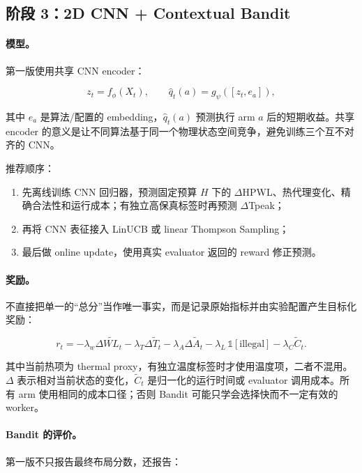 \documentclass[UTF8,a4paper,11pt]{ctexart}
\begin{document}
\subsection{阶段 3：2D CNN + Contextual Bandit}

\paragraph{模型。} 第一版使用共享 CNN encoder：

\begin{equation}
z_t=f_\phi(X_t),\qquad
\hat{q}_t(a)=g_\psi([z_t,e_a]),
\end{equation}

其中 \(e_a\) 是算法/配置的 embedding，\(\hat{q}_t(a)\) 预测执行 arm \(a\) 后的短期收益。共享 encoder 的意义是让不同算法基于同一个物理状态空间竞争，避免训练三个互不对齐的 CNN。

推荐顺序：

\begin{enumerate}
    \item 先离线训练 CNN 回归器，预测固定预算 \(H\) 下的 \(\Delta\)HPWL、热代理变化、精确合法性和运行成本；有独立高保真标签时再预测 \(\Delta\)Tpeak；
    \item 再将 CNN 表征接入 LinUCB 或 linear Thompson Sampling；
    \item 最后做 online update，使用真实 evaluator 返回的 reward 修正预测。
\end{enumerate}

\paragraph{奖励。} 不直接把单一的“总分”当作唯一事实，而是记录原始指标并由实验配置产生目标化奖励：

\begin{equation}
r_t = -\lambda_w\Delta \widetilde{WL}_t
       -\lambda_T\Delta \widetilde{T}_t
       -\lambda_A\Delta \widetilde{A}_t
       -\lambda_L\,\mathbb{1}[\text{illegal}]
       -\lambda_C\widetilde{C}_t.
\end{equation}

其中当前热项为 thermal proxy，有独立温度标签时才使用温度项，二者不混用。\(\Delta\) 表示相对当前状态的变化，\(\widetilde{C}_t\) 是归一化的运行时间或 evaluator 调用成本。所有 arm 使用相同的成本口径；否则 Bandit 可能只学会选择快而不一定有效的 worker。

\paragraph{Bandit 的评价。} 第一版不只报告最终布局分数，还报告：
\end{document}
